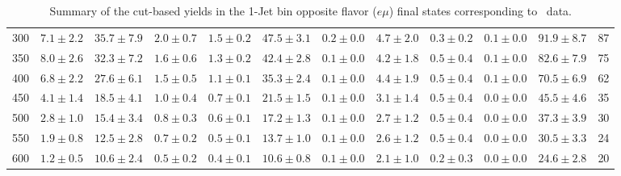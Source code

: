\begin{table}[!ht]
{\begin{center}
\begin{tabular}{l c c c c c c c c c c c }
300 & $7.1\pm2.2$ & $35.7\pm7.9$ & $2.0\pm0.7$ & $1.5\pm0.2$ & $47.5\pm3.1$ & $0.2\pm0.0$ & $4.7\pm2.0$ & $0.3\pm0.2$ & $0.1\pm0.0$ & $91.9\pm8.7$ & 87 \\
350 & $8.0\pm2.6$ & $32.3\pm7.2$ & $1.6\pm0.6$ & $1.3\pm0.2$ & $42.4\pm2.8$ & $0.1\pm0.0$ & $4.2\pm1.8$ & $0.5\pm0.4$ & $0.1\pm0.0$ & $82.6\pm7.9$ & 75 \\
400 & $6.8\pm2.2$ & $27.6\pm6.1$ & $1.5\pm0.5$ & $1.1\pm0.1$ & $35.3\pm2.4$ & $0.1\pm0.0$ & $4.4\pm1.9$ & $0.5\pm0.4$ & $0.1\pm0.0$ & $70.5\pm6.9$ & 62 \\
450 & $4.1\pm1.4$ & $18.5\pm4.1$ & $1.0\pm0.4$ & $0.7\pm0.1$ & $21.5\pm1.5$ & $0.1\pm0.0$ & $3.1\pm1.4$ & $0.5\pm0.4$ & $0.0\pm0.0$ & $45.5\pm4.6$ & 35 \\
500 & $2.8\pm1.0$ & $15.4\pm3.4$ & $0.8\pm0.3$ & $0.6\pm0.1$ & $17.2\pm1.3$ & $0.1\pm0.0$ & $2.7\pm1.2$ & $0.5\pm0.4$ & $0.0\pm0.0$ & $37.3\pm3.9$ & 30 \\
550 & $1.9\pm0.8$ & $12.5\pm2.8$ & $0.7\pm0.2$ & $0.5\pm0.1$ & $13.7\pm1.0$ & $0.1\pm0.0$ & $2.6\pm1.2$ & $0.5\pm0.4$ & $0.0\pm0.0$ & $30.5\pm3.3$ & 24 \\
600 & $1.2\pm0.5$ & $10.6\pm2.4$ & $0.5\pm0.2$ & $0.4\pm0.1$ & $10.6\pm0.8$ & $0.1\pm0.0$ & $2.1\pm1.0$ & $0.2\pm0.3$ & $0.0\pm0.0$ & $24.6\pm2.8$ & 20 \\
\hline
\end{tabular}
\end{center}
}
\caption{Summary of the cut-based yields in the 1-Jet bin opposite flavor ($e\mu$) final states corresponding to \intlumi\ data.}
\end{table}

